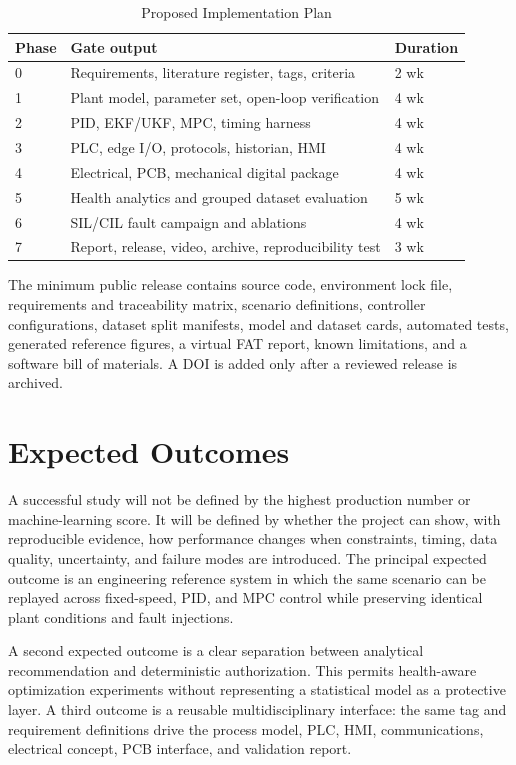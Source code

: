\documentclass[conference]{IEEEtran}
\begin{document}
\begin{table}[t]
\caption{Proposed Implementation Plan}
\label{tab:plan}
\centering
\footnotesize
\begin{tabularx}{\columnwidth}{p{}Y p{0.16\columnwidth}}
\toprule
Phase & Gate output & Duration \\
 & Requirements, literature register, tags, criteria & 2 wk \\
1 & Plant model, parameter set, open-loop verification & 4 wk \\
2 & PID, EKF/UKF, MPC, timing harness & 4 wk \\
3 & PLC, edge I/O, protocols, historian, HMI & 4 wk \\
4 & Electrical, PCB, mechanical digital package & 4 wk \\
5 & Health analytics and grouped dataset evaluation & 5 wk \\
6 & SIL/CIL fault campaign and ablations & 4 wk \\
7 & Report, release, video, archive, reproducibility test & 3 wk \\
\bottomrule
\end{tabularx}
\end{table}

The minimum public release contains source code, environment lock file, requirements and traceability matrix, scenario definitions, controller configurations, dataset split manifests, model and dataset cards, automated tests, generated reference figures, a virtual FAT report, known limitations, and a software bill of materials. A DOI is added only after a reviewed release is archived.

\section{Expected Outcomes}
A successful study will not be defined by the highest production number or machine-learning score. It will be defined by whether the project can show, with reproducible evidence, how performance changes when constraints, timing, data quality, uncertainty, and failure modes are introduced. The principal expected outcome is an engineering reference system in which the same scenario can be replayed across fixed-speed, PID, and MPC control while preserving identical plant conditions and fault injections.

A second expected outcome is a clear separation between analytical recommendation and deterministic authorization. This permits health-aware optimization experiments without representing a statistical model as a protective layer. A third outcome is a reusable multidisciplinary interface: the same tag and requirement definitions drive the process model, PLC, HMI, communications, electrical concept, PCB interface, and validation report.
\end{document}
